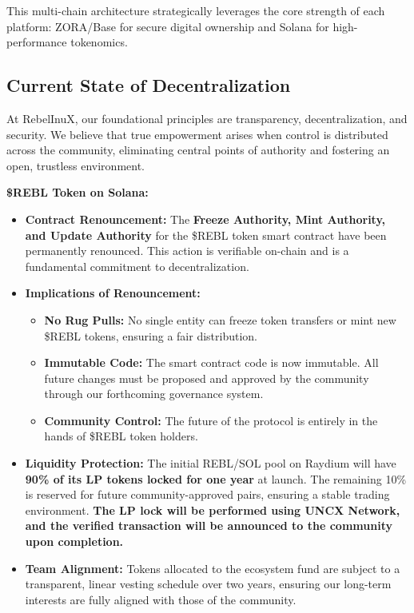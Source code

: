 \documentclass{article}
\begin{document}
\begin{tcolorbox}[colback=headerColor!10!white, colframe=headerColor, boxrule=2pt, width=\textwidth, arc=6mm, left=8mm, right=8mm, top=6mm, bottom=6mm]
\noindent
This multi-chain architecture strategically leverages the core strength of each platform: ZORA/Base for secure digital ownership and Solana for high-performance tokenomics.
\end{tcolorbox}

\begin{tcolorbox}[colback=headerColor!10!white, colframe=headerColor, boxrule=2pt, width=\textwidth, arc=6mm, left=8mm, right=8mm, top=6mm, bottom=6mm]
\subsection[
  \texorpdfstring{\color{primaryColor}Current State of Decentralization}{Current State of Decentralization}
]{\color{primaryColor}\textbf{Current State of Decentralization}}
\label{sec:decentralization}
At RebelInuX, our foundational principles are transparency, decentralization, and security. We believe that true empowerment arises when control is distributed across the community, eliminating central points of authority and fostering an open, trustless environment.

\noindent
\textbf{\$REBL Token on Solana:}
\begin{itemize}
    \item \textbf{Contract Renouncement:} The \textbf{Freeze Authority, Mint Authority, and Update Authority} for the \$REBL token smart contract have been permanently renounced. This action is verifiable on-chain and is a fundamental commitment to decentralization.
    \item \textbf{Implications of Renouncement:}
    \begin{itemize}
        \item \textbf{No Rug Pulls:} No single entity can freeze token transfers or mint new \$REBL tokens, ensuring a fair distribution.
        \item \textbf{Immutable Code:} The smart contract code is now immutable. All future changes must be proposed and approved by the community through our forthcoming governance system.
        \item \textbf{Community Control:} The future of the protocol is entirely in the hands of \$REBL token holders.
    \end{itemize}
\item \textbf{Liquidity Protection:} The initial REBL/SOL pool on Raydium will have \textbf{90\% of its LP tokens locked for one year} at launch. The remaining 10\% is reserved for future community-approved pairs, ensuring a stable trading environment. \textbf{The LP lock will be performed using UNCX Network, and the verified transaction will be announced to the community upon completion.}
    \item \textbf{Team Alignment:} Tokens allocated to the ecosystem fund are subject to a transparent, linear vesting schedule over two years, ensuring our long-term interests are fully aligned with those of the community.
\end{itemize}


\end{tcolorbox}
\end{document}

